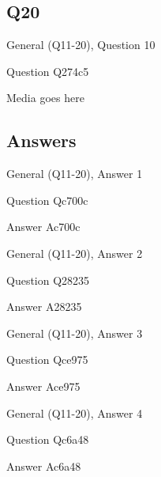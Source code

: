\documentclass[11pt]{beamer}
\begin{document}
\subsection*{Q20}
\begin{frame}[t]{General (Q11-20), Question 10}
\vspace{2em}
\begin{block}{Question}
Q274c5
\end{block}
\begin{center}
Media goes here
\end{center}
\end{frame}
    
\subsection{Answers}

\begin{frame}[t]{General (Q11-20), Answer 1}
\vspace{2em}
\begin{block}{Question}
Qc700c
\end{block}
\pause{}
\begin{block}{Answer}
Ac700c
\end{block}
\end{frame}
    

\begin{frame}[t]{General (Q11-20), Answer 2}
\vspace{2em}
\begin{block}{Question}
Q28235
\end{block}
\pause{}
\begin{block}{Answer}
A28235
\end{block}
\end{frame}
    

\begin{frame}[t]{General (Q11-20), Answer 3}
\vspace{2em}
\begin{block}{Question}
Qce975
\end{block}
\pause{}
\begin{block}{Answer}
Ace975
\end{block}
\end{frame}
    

\begin{frame}[t]{General (Q11-20), Answer 4}
\vspace{2em}
\begin{block}{Question}
Qc6a48
\end{block}
\pause{}
\begin{block}{Answer}
Ac6a48
\end{block}
\end{frame}
    
\end{document}
